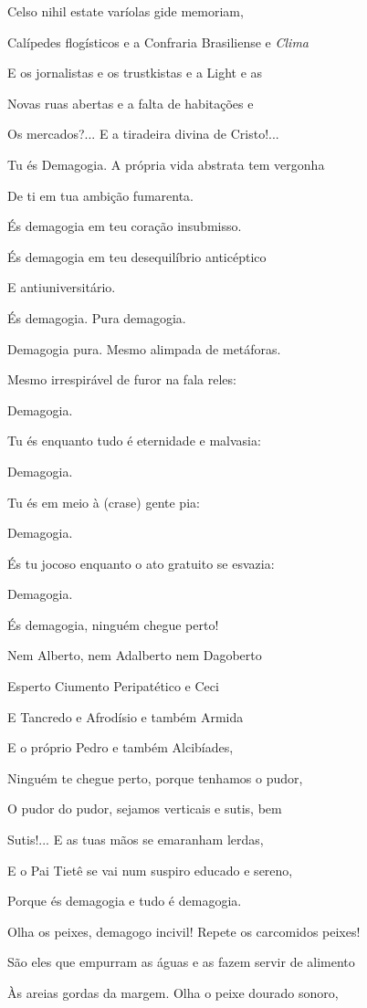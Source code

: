 Celso nihil estate varíolas gide memoriam,

Calípedes flogísticos e a Confraria Brasiliense e \emph{Clima}

E os jornalistas e os trustkistas e a Light e as

Novas ruas abertas e a falta de habitações e

Os mercados?... E a tiradeira divina de Cristo!...

Tu és Demagogia. A própria vida abstrata tem vergonha

De ti em tua ambição fumarenta.

És demagogia em teu coração insubmisso.

És demagogia em teu desequilíbrio anticéptico

E antiuniversitário.

És demagogia. Pura demagogia.

Demagogia pura. Mesmo alimpada de metáforas.

Mesmo irrespirável de furor na fala reles:

Demagogia.

Tu és enquanto tudo é eternidade e malvasia:

Demagogia.

Tu és em meio à (crase) gente pia:

Demagogia.

És tu jocoso enquanto o ato gratuito se esvazia:

Demagogia.

És demagogia, ninguém chegue perto!

Nem Alberto, nem Adalberto nem Dagoberto

Esperto Ciumento Peripatético e Ceci

E Tancredo e Afrodísio e também Armida

E o próprio Pedro e também Alcibíades,

Ninguém te chegue perto, porque tenhamos o pudor,

O pudor do pudor, sejamos verticais e sutis, bem

Sutis!... E as tuas mãos se emaranham lerdas,

E o Pai Tietê se vai num suspiro educado e sereno,

Porque és demagogia e tudo é demagogia.

Olha os peixes, demagogo incivil! Repete os carcomidos peixes!

São eles que empurram as águas e as fazem servir de alimento

Às areias gordas da margem. Olha o peixe dourado sonoro,

